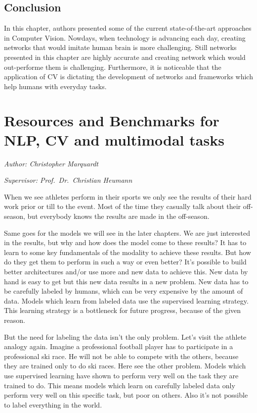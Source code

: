 \documentclass[
]{krantz}
\begin{document}
\hypertarget{conclusion}{%
\subsection{Conclusion}\label{conclusion}}

In this chapter, authors presented some of the current state-of-the-art approaches in Computer Vision. Nowdays, when technology is advancing each day, creating networks that would imitate human brain is more challenging. Still networks presented in this chapter are highly accurate and creating network which would out-performe them is challenging. Furthermore, it is noticeable that the application of CV is dictating the development of networks and frameworks which help humans with everyday tasks.

\hypertarget{c01-03-benchmarks}{%
\section{Resources and Benchmarks for NLP, CV and multimodal tasks}\label{c01-03-benchmarks}}

\emph{Author: Christopher Marquardt}

\emph{Supervisor: Prof.~Dr.~Christian Heumann}

When we see athletes perform in their sports we only see the results of their hard work prior or till to the event. Most of the time they casually talk about their off-season, but everybody knows the results are made in the off-season.

Same goes for the models we will see in the later chapters. We are just interested in the results, but why and how does the model come to these results? It has to learn to some key fundamentals of the modality to achieve these results. But how do they get them to perform in such a way or even better? It's possible to build better architectures and/or use more and new data to achieve this. New data by hand is easy to get but this new data results in a new problem. New data has to be carefully labeled by humans, which can be very expensive by the amount of data. Models which learn from labeled data use the supervised learning strategy. This learning strategy is a bottleneck for future progress, because of the given reason.

But the need for labeling the data isn't the only problem. Let's visit the athlete analogy again. Imagine a professional football player has to participate in a professional ski race. He will not be able to compete with the others, because they are trained only to do ski races. Here see the other problem. Models which use supervised learning have shown to perform very well on the task they are trained to do. This means models which learn on carefully labeled data only perform very well on this specific task, but poor on others. Also it's not possible to label everything in the world.
\end{document}
